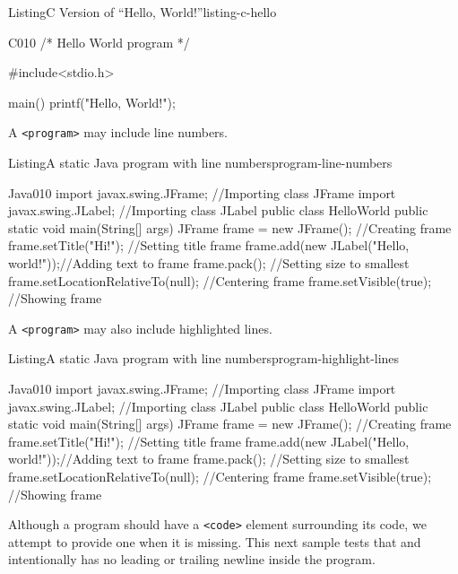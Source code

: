 \documentclass{amsart}
\theoremstyle{plain}%
\theoremstyle{definition}%
\theoremstyle{remark}%
\newcommand{\mono}[1]{\texttt{#1}}
\numberwithin{equation}{section}
\begin{document}
\begin{listingptx}{Listing}{C Version of ``Hello, World!''}{listing-c-hello}{}%
\begin{program}{C}{0}{1}{0}
/* Hello World program */

#include<stdio.h>

main()
{
    printf("Hello, World!");
}
\end{program}
\tcblower
\end{listingptx}%
A \mono{<program>} may include line numbers.%
\begin{listingptx}{Listing}{A static Java program with line numbers}{program-line-numbers}{}%
\begin{programnumbered}{Java}{0}{1}{0}
import javax.swing.JFrame;  //Importing class JFrame
import javax.swing.JLabel;  //Importing class JLabel
public class HelloWorld {
    public static void main(String[] args) {
        JFrame frame = new JFrame();           //Creating frame
        frame.setTitle("Hi!");                 //Setting title frame
        frame.add(new JLabel("Hello, world!"));//Adding text to frame
        frame.pack();                          //Setting size to smallest
        frame.setLocationRelativeTo(null);     //Centering frame
        frame.setVisible(true);                //Showing frame
    }
}
\end{programnumbered}
\tcblower
\end{listingptx}%
A \mono{<program>} may also include highlighted lines.%
\begin{listingptx}{Listing}{A static Java program with line numbers}{program-highlight-lines}{}%
\begin{programnumbered}{Java}{0}{1}{0}
import javax.swing.JFrame;  //Importing class JFrame
import javax.swing.JLabel;  //Importing class JLabel
public class HelloWorld {
    public static void main(String[] args) {
        JFrame frame = new JFrame();           //Creating frame
        frame.setTitle("Hi!");                 //Setting title frame
        frame.add(new JLabel("Hello, world!"));//Adding text to frame
        frame.pack();                          //Setting size to smallest
        frame.setLocationRelativeTo(null);     //Centering frame
        frame.setVisible(true);                //Showing frame
    }
}
\end{programnumbered}
\tcblower
\end{listingptx}%
Although a program should have a \mono{<code>} element surrounding its code, we attempt to provide one when it is missing. This next sample tests that and intentionally has no leading or trailing newline inside the program.%
\end{document}
